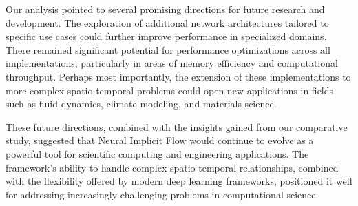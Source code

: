 \documentclass[10pt,journal,compsoc,onecolumn]{IEEEtran}
\begin{document}
Our analysis pointed to several promising directions for future research and development. The exploration of additional network architectures tailored to specific use cases could further improve performance in specialized domains. There remained significant potential for performance optimizations across all implementations, particularly in areas of memory efficiency and computational throughput. Perhaps most importantly, the extension of these implementations to more complex spatio-temporal problems could open new applications in fields such as fluid dynamics, climate modeling, and materials science.

These future directions, combined with the insights gained from our comparative study, suggested that Neural Implicit Flow would continue to evolve as a powerful tool for scientific computing and engineering applications. The framework's ability to handle complex spatio-temporal relationships, combined with the flexibility offered by modern deep learning frameworks, positioned it well for addressing increasingly challenging problems in computational science.



\end{document}

